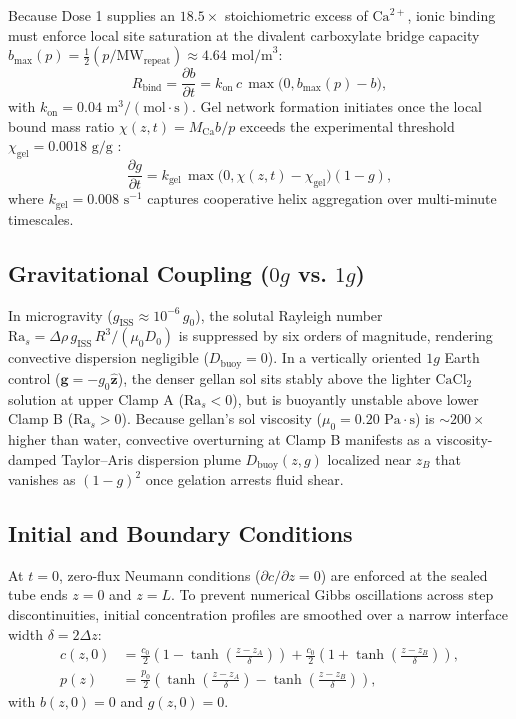 \documentclass[11pt,twocolumn]{article}
\begin{document}
Because Dose 1 supplies an $18.5\times$ stoichiometric excess of $\text{Ca}^{2+}$, ionic binding must enforce local site saturation at the divalent carboxylate bridge capacity $b_{\max}(p) = \frac{1}{2}(p / \text{MW}_{\text{repeat}}) \approx 4.64\text{ mol/m}^3$:
\begin{equation}
R_{\text{bind}} = \frac{\partial b}{\partial t} = k_{\text{on}}\, c\, \max\big(0, b_{\max}(p) - b\big),
\label{eq:binding}
\end{equation}
with $k_{\text{on}} = 0.04\text{ m}^3/(\text{mol}\cdot\text{s})$. Gel network formation initiates once the local bound mass ratio $\chi(z,t) = M_{\text{Ca}} b / p$ exceeds the experimental threshold $\chi_{\text{gel}} = 0.0018\text{ g/g}$ \cite{ambebila2019}:
\begin{equation}
\frac{\partial g}{\partial t} = k_{\text{gel}}\, \max\big(0, \chi(z,t) - \chi_{\text{gel}}\big)(1 - g),
\label{eq:gelation}
\end{equation}
where $k_{\text{gel}} = 0.008\text{ s}^{-1}$ captures cooperative helix aggregation over multi-minute timescales.

\subsection{Gravitational Coupling ($0g$ vs. $1g$)}
In microgravity ($g_{\text{ISS}} \approx 10^{-6}\,g_0$), the solutal Rayleigh number $\text{Ra}_s = \Delta\rho\, g_{\text{ISS}}\, R^3 / (\mu_0 D_0)$ is suppressed by six orders of magnitude, rendering convective dispersion negligible ($D_{\text{buoy}} = 0$). In a vertically oriented $1g$ Earth control ($\mathbf{g} = -g_0\hat{\mathbf{z}}$), the denser gellan sol sits stably above the lighter $\text{CaCl}_2$ solution at upper Clamp A ($\text{Ra}_s < 0$), but is buoyantly unstable above lower Clamp B ($\text{Ra}_s > 0$). Because gellan's sol viscosity ($\mu_0 = 0.20\text{ Pa}\cdot\text{s}$) is $\sim 200\times$ higher than water, convective overturning at Clamp B manifests as a viscosity-damped Taylor--Aris dispersion plume $D_{\text{buoy}}(z, g)$ localized near $z_B$ that vanishes as $(1 - g)^2$ once gelation arrests fluid shear.

\subsection{Initial and Boundary Conditions}
At $t = 0$, zero-flux Neumann conditions ($\partial c / \partial z = 0$) are enforced at the sealed tube ends $z = 0$ and $z = L$. To prevent numerical Gibbs oscillations across step discontinuities, initial concentration profiles are smoothed over a narrow interface width $\delta = 2\Delta z$:
\begin{align}
c(z, 0) &= \frac{c_0}{2}\left(1 - \tanh\left(\frac{z - z_A}{\delta}\right)\right) + \frac{c_0}{2}\left(1 + \tanh\left(\frac{z - z_B}{\delta}\right)\right), \\
p(z) &= \frac{p_0}{2}\left(\tanh\left(\frac{z - z_A}{\delta}\right) - \tanh\left(\frac{z - z_B}{\delta}\right)\right),
\end{align}
with $b(z,0) = 0$ and $g(z,0) = 0$.
\end{document}
